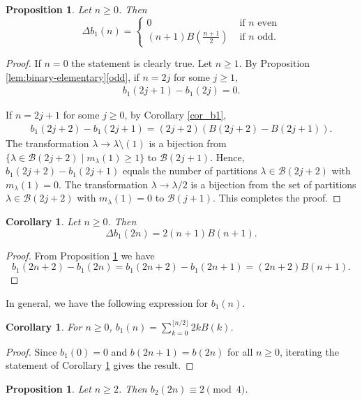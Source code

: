 \documentclass[reqno]{amsart}
\newtheorem{corollary}[theorem]{Corollary}
\newtheorem{proposition}[theorem]{Proposition}
\theoremstyle{definition}
\begin{document}
\begin{proposition} \label{delta_b1}
     Let $n\geq 0$. Then $$\Delta b_1(n)=\begin{cases} 0 & \text{ if $n$ even}\\ (n+1)B(\frac{n+1}{2})
   & \text{ if $n$ odd.}
\end{cases}$$
    \end{proposition}
    \begin{proof}
If $n=0$ the statement is clearly true. Let $n\geq 1$.   
By Proposition \ref{lem:binary-elementary}\ref{odd}, if $n=2j$ for some $j\geq 1$,   \begin{align*}b_1(2j+1)-b_1(2j) =0.\end{align*}

    If $n=2j+1$ for some $j\geq 0$, by Corollary \ref{cor_b1}, \begin{align*}b_1(2j+2)-b_1(2j+1) =(2j+2)\left(B(2j+2)- B(2j+1)\right).\end{align*}
    The  transformation $\lambda \to \lambda\setminus(1)$ is a bijection from  $\{\lambda\in \mathcal B(2j+2)\mid m_\lambda(1)\geq 1\}$  to $\mathcal B(2j+1)$. Hence, $b_1(2j+2)-b_1(2j+1)$ equals the number of partitions $\lambda\in \mathcal B(2j+2)$ with $m_\lambda(1)=0$. The transformation $\lambda\to\lambda/2$  is a bijection from the set of partitions $\lambda\in \mathcal B(2j+2)$ with $m_\lambda(1)=0$ to $\mathcal B(j+1)$. This completes the proof. 
    \end{proof}
  \begin{corollary} \label{cor:forward_b_1_2n}
       Let $n\geq 0$.  Then $$\Delta b_1(2n)=2(n+1)B(n+1).$$
      \end{corollary} 
      \begin{proof} 
From Proposition \ref{delta_b1} we have $$b_1(2n+2)-b_1(2n)=b_1(2n+2)-b_1(2n+1)=(2n+2)B(n+1).$$
 \end{proof}
 In general, we have the following expression for $b_1(n)$. 
\begin{corollary} \label{cor:b1_new} For $n\geq 0$,
    $\displaystyle b_1(n)=\sum_{k=0}^{\lfloor n/2\rfloor}2kB(k)$.
\end{corollary}
\begin{proof} Since $b_1(0)=0$ and $b(2n+1)=b(2n)$ for all $n\geq 0$, iterating the statement of Corollary \ref{cor:forward_b_1_2n} gives the result. 
    \end{proof}
\begin{proposition} \label{b2 mod 4} Let $n\geq 2$. Then $b_2(2n)\equiv 2\pmod 4$.
    \end{proposition}
\end{document}
